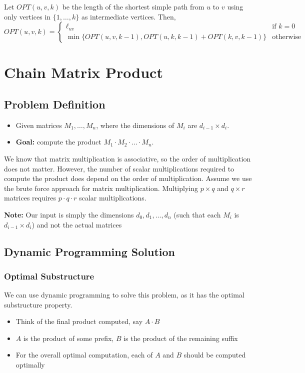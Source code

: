 Let $OPT(u, v, k)$ be the length of the shortest simple path from $u$ to $v$ using only vertices in $\{1, \dots, k\}$ as intermediate vertices. Then, \[
    OPT(u, v, k) = \begin{cases}
        \ell_{uv}                                                     & \text{if } k = 0 \\
        \min\{OPT(u, v, k - 1), OPT(u, k, k - 1) + OPT(k, v, k - 1)\} & \text{otherwise}
    \end{cases}
\]

\section{Chain Matrix Product}

\subsection{Problem Definition}

\begin{itemize}
    \item Given matrices $M_1, \dots, M_n$, where the dimensions of $M_i$ are $d_{i - 1} \times d_i$.
    \item \textbf{Goal:} compute the product $M_1 \cdot M_2 \cdot \dots \cdot M_n$. 
\end{itemize}

We know that matrix multiplication is associative, so the order of multiplication does not matter. However, the number of scalar multiplications required to compute the product does depend on the order of multiplication. Assume we use the brute force approach for matrix multiplication. Multiplying $p \times q$ and $q \times r$ matrices requires $p \cdot q \cdot r$ scalar multiplications.

\textbf{Note:} Our input is simply the dimensions $d_0, d_1, \dots , d_n$ (such that each $M_i$ is $d_{i-1} \times d_i$) and not the actual matrices

\subsection{Dynamic Programming Solution}

\subsubsection{Optimal Substructure}

We can use dynamic programming to solve this problem, as it has the optimal substructure property.
\begin{itemize}
    \item Think of the final product computed, say $A \cdot B$
    \item $A$ is the product of some prefix, $B$ is the product of the remaining suffix
    \item For the overall optimal computation, each of $A$ and $B$ should be computed optimally
\end{itemize}


